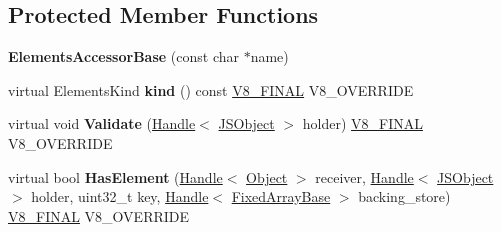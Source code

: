 \subsection*{Protected Member Functions}
\begin{DoxyCompactItemize}
\item 
\hypertarget{classv8_1_1internal_1_1_elements_accessor_base_a352dd4a811d0d2c7e0e99cd2a478d595}{}{\bfseries Elements\+Accessor\+Base} (const char $\ast$name)\label{classv8_1_1internal_1_1_elements_accessor_base_a352dd4a811d0d2c7e0e99cd2a478d595}

\item 
\hypertarget{classv8_1_1internal_1_1_elements_accessor_base_ac0a59b64f99a53f4a184b3462321cd6f}{}virtual Elements\+Kind {\bfseries kind} () const \hyperlink{classv8_1_1internal_1_1_v8___f_i_n_a_l}{V8\+\_\+\+F\+I\+N\+A\+L} V8\+\_\+\+O\+V\+E\+R\+R\+I\+D\+E\label{classv8_1_1internal_1_1_elements_accessor_base_ac0a59b64f99a53f4a184b3462321cd6f}

\item 
\hypertarget{classv8_1_1internal_1_1_elements_accessor_base_af310c27f9393476e013d872b4a6e18ac}{}virtual void {\bfseries Validate} (\hyperlink{classv8_1_1internal_1_1_handle}{Handle}$<$ \hyperlink{classv8_1_1internal_1_1_j_s_object}{J\+S\+Object} $>$ holder) \hyperlink{classv8_1_1internal_1_1_v8___f_i_n_a_l}{V8\+\_\+\+F\+I\+N\+A\+L} V8\+\_\+\+O\+V\+E\+R\+R\+I\+D\+E\label{classv8_1_1internal_1_1_elements_accessor_base_af310c27f9393476e013d872b4a6e18ac}

\item 
\hypertarget{classv8_1_1internal_1_1_elements_accessor_base_ae034523ee9de30a96942818ab029308c}{}virtual bool {\bfseries Has\+Element} (\hyperlink{classv8_1_1internal_1_1_handle}{Handle}$<$ \hyperlink{classv8_1_1internal_1_1_object}{Object} $>$ receiver, \hyperlink{classv8_1_1internal_1_1_handle}{Handle}$<$ \hyperlink{classv8_1_1internal_1_1_j_s_object}{J\+S\+Object} $>$ holder, uint32\+\_\+t key, \hyperlink{classv8_1_1internal_1_1_handle}{Handle}$<$ \hyperlink{classv8_1_1internal_1_1_fixed_array_base}{Fixed\+Array\+Base} $>$ backing\+\_\+store) \hyperlink{classv8_1_1internal_1_1_v8___f_i_n_a_l}{V8\+\_\+\+F\+I\+N\+A\+L} V8\+\_\+\+O\+V\+E\+R\+R\+I\+D\+E\label{classv8_1_1internal_1_1_elements_accessor_base_ae034523ee9de30a96942818ab029308c}


\end{DoxyCompactItemize}

